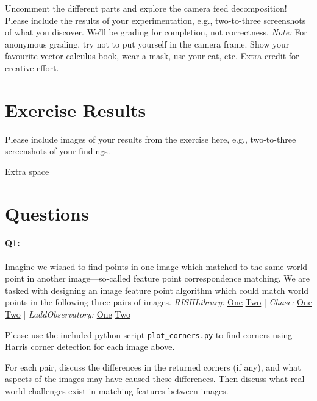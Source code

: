 Uncomment the different parts and explore the camera feed decomposition! Please include the results of your experimentation, e.g., two-to-three screenshots of what you discover. We'll be grading for completion, not correctness. \emph{Note:} For anonymous grading, try not to put yourself in the camera frame. Show your favourite vector calculus book, wear a mask, use your cat, etc. Extra credit for creative effort.


\pagebreak
\section*{Exercise Results}
Please include images of your results from the exercise here, e.g., two-to-three screenshots of your findings.




\pagebreak
Extra space





\pagebreak
\section*{Questions}

\paragraph{Q1:} Imagine we wished to find points in one image which matched to the same world point in another image---so-called feature point correspondence matching. We are tasked with designing an image feature point algorithm which could match world points in the following three pairs of images. 
\newline
\newline
\emph{RISHLibrary:} \href{RISHLibrary1.jpg}{One} \href{RISHLibrary2.jpg}{Two} | \emph{Chase:} \href{Chase1.jpg}{One} \href{Chase2.jpg}{Two} | \emph{LaddObservatory:} \href{LaddObservatory1.jpg}{One} \href{LaddObservatory2.jpg}{Two}

Please use the included python script \texttt{plot\_corners.py} to find corners using Harris corner detection for each image above. 

For each pair, discuss the differences in the returned corners (if any), and what aspects of the images may have caused these differences. Then discuss what real world challenges exist in matching features between images.


